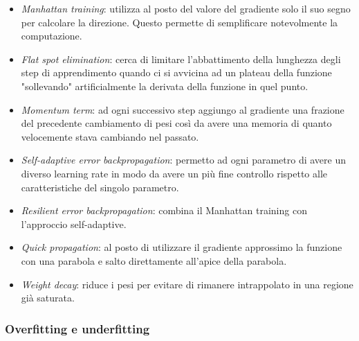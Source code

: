 \documentclass[10pt,a4paper]{article}
\begin{document}
\begin{itemize}
\item{\emph{Manhattan training}: utilizza al posto del valore del gradiente solo il suo segno per calcolare la direzione. Questo permette di semplificare notevolmente la computazione.}
\item{\emph{Flat spot elimination}: cerca di limitare l'abbattimento della lunghezza degli step di apprendimento quando ci si avvicina ad un plateau della funzione "sollevando" artificialmente la derivata della funzione in quel punto.}
\item{\emph{Momentum term}: ad ogni successivo step aggiungo al gradiente una frazione del precedente cambiamento di pesi così da avere una memoria di quanto velocemente stava cambiando nel passato.}
\item{\emph{Self-adaptive error backpropagation}: permetto ad ogni parametro di avere un diverso learning rate in modo da avere un più fine controllo rispetto alle caratteristiche del singolo parametro.}
\item{\emph{Resilient error backpropagation}: combina il Manhattan training con l'approccio self-adaptive.}
\item{\emph{Quick propagation}: al posto di utilizzare il gradiente approssimo la funzione con una parabola e salto direttamente all'apice della parabola.}
\item{\emph{Weight decay}: riduce i pesi per evitare di rimanere intrappolato in una regione già saturata.}
\end{itemize}

\subsubsection{Overfitting e underfitting}
\end{document}
